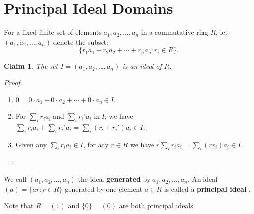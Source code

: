 \documentclass[a4paper,12pt]{report}
\newcounter{statement}
\numberwithin{statement}{chapter}
\newtheorem{claim}[statement]{Claim}
\numberwithin{equation}{chapter}
\numberwithin{section}{chapter}
\numberwithin{subsection}{section}
\begin{document}
\section{Principal Ideal Domains}

For a fixed finite set of elements $a_1, a_2,\ldots, a_n$ in a commutative ring $R$,
let $(a_1, a_2,\ldots, a_n)$ denote the subset:
\[
\{r_1 a_1 + r_2 a_2 + \cdots + r_n a_n : r_i \in R\}.
\]
\begin{claim}

The set $I = (a_1, a_2, \ldots, a_n)$ is an ideal of $R$.
\end{claim}
\begin{proof}

\begin{enumerate}
\item 
$0 = 0\cdot a_1 + 0 \cdot a_2 + \cdots + 0\cdot a_n \in I$.

\item 
For $\sum_{i} r_i a_i$ and $\sum_i r_i'a_i$ in $I$, we have
$\sum_i r_i a_i + \sum_i r_i'a_i = \sum_i (r_i + r_i')a_i \in I$.

\item 
Given any $\sum_i r_ia_i \in I$, for any $r \in R$ we have
$r \sum_i r_i a_i = \sum_i (rr_i) a_i \in I$.

\end{enumerate}

\end{proof}

We call $(a_1, a_2,\ldots, a_n)$ the ideal  {\bf generated}  by $a_1, a_2, \ldots, a_n$.
An ideal $(a) = \{ar : r \in R\}$ generated by one element $a \in R$ is called a  {\bf principal ideal} .


Note that $R = (1)$ and $\{0\} = (0)$ are both principal ideals.
\end{document}
